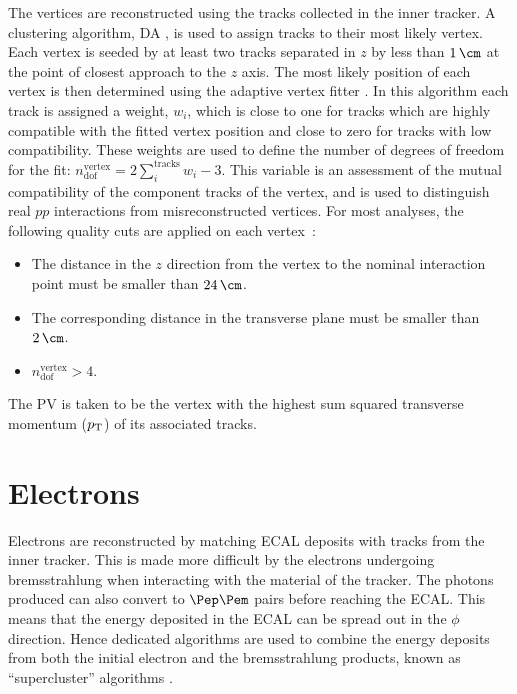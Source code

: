 The vertices are reconstructed using the tracks collected in the inner
tracker. A clustering algorithm, \ac{DA}
\cite{DetAnnealing}, is used to assign tracks to their most likely 
vertex. Each vertex is seeded by at least two tracks separated in $z$ by less than
$1\,\cm$ at the point of closest approach to the $z$ axis.
The most likely position of each vertex is then determined using the
adaptive vertex fitter \cite{adaptivevertex}. In
this algorithm each track is assigned a weight, $w_{i}$, which is close to one for tracks which
are highly compatible with the fitted vertex position and close to zero for tracks with low
compatibility. These weights are used to define the number of degrees of freedom
for the fit: $n_{\text{dof}}^{\text{vertex}} = 2\sum_{i}^{\text{tracks}}w_{i}-3$. This
variable is an assessment of the mutual compatibility of the component tracks of
the vertex, and is used to distinguish real $pp$ interactions from
misreconstructed vertices. For most analyses, the following quality cuts are
applied on each vertex~\cite{CMS-PAS-TRK-10-005}:
\begin{itemize}
\item The distance in the $z$ direction from the vertex to the nominal interaction
point must be smaller than $24\,\cm$. 
\item The corresponding distance in the transverse plane must be smaller than
$2\,\cm$.
\item $n_{\text{dof}}^{\text{vertex}} > 4$.
\end{itemize}

The \ac{PV} is taken to be the vertex with the highest sum squared transverse
momentum ($p_{\mathrm{T}}$) of its associated tracks. 

\section{Electrons}
\label{sec:electrons}

Electrons are reconstructed by matching \ac{ECAL} deposits with tracks from the
inner tracker. This is made more difficult by the electrons
undergoing bremsstrahlung when interacting with the material of the tracker.
The photons produced can also convert to $\Pep\Pem$ pairs before
reaching the \ac{ECAL}. This means that the energy deposited in the \ac{ECAL} 
can be spread out in the $\phi$ direction. Hence dedicated algorithms are used
to combine the energy deposits from both the initial electron and the
bremsstrahlung products, known as ``supercluster'' algorithms \cite{ElectronReco}.

